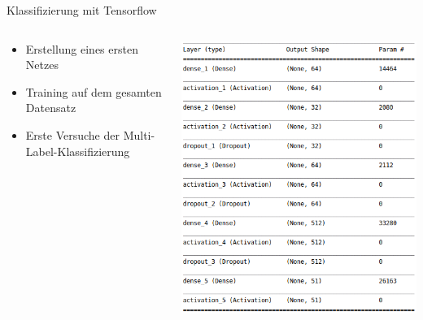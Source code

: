 \documentclass[10pt,%
	wide,%
	xcolor={x11names},%
	hyperref={colorlinks},%
	pantone312,%
	handout,%
	]{beamer}
\begin{document}
\begin{frame}[t]{Klassifizierung mit Tensorflow}
	\begin{columns}
		\begin{column}[t]{6cm}
			\begin{itemize}
				\item Erstellung eines ersten Netzes
				\item Training auf dem gesamten Datensatz
				\item Erste Versuche der Multi-Label-Klassifizierung
			\end{itemize}
		\end{column}
		\begin{column}[t]{6cm}
			\begin{center}
				\includegraphics[width=.85\textwidth]{img/keras_network_summary.png}
			\end{center}
		\end{column}		
	\end{columns}
\end{frame}
\end{document}
